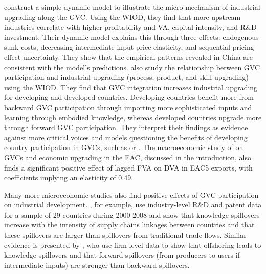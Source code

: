 \documentclass[a4paper]{article}
\begin{document}
\citet{shen2021towards} construct a simple dynamic model to illustrate the micro-mechanism of industrial upgrading along the GVC. Using the WIOD, they find that more upstream industries correlate with higher profitability and VA, capital intensity, and R\&D investment. Their dynamic model explains this through three effects: endogenous sunk costs, decreasing intermediate input price elasticity, and sequential pricing effect uncertainty. They show that the empirical patterns revealed in China are consistent with the model's predictions. \citet{tian2022global} also study the relationship between GVC participation and industrial upgrading (process, product, and skill upgrading) using the WIOD. They find that GVC integration increases industrial upgrading for developing and developed countries. Developing countries benefit more from backward GVC participation through importing more sophisticated inputs and learning through embodied knowledge, whereas developed countries upgrade more through forward GVC participation. They interpret their findings as evidence against more critical voices and models questioning the benefits of developing country participation in GVCs, such as \citet{baldwin2014trade} or \citet{dalle2013industrial}. The macroeconomic study of \citet{lwesya2022integration} on GVCs and economic upgrading in the EAC, discussed in the introduction, also finds a significant positive effect of lagged FVA on DVA in EAC5 exports, with coefficients implying an elasticity of 0.49. \newline 

Many more microeconomic studies also find positive effects of GVC participation on industrial development. \citet{piermartini2014knowledge}, for example, use industry-level R\&D and patent data for a sample of 29 countries during 2000-2008 and show that knowledge spillovers increase with the intensity of supply chains linkages between countries and that these spillovers are larger than spillovers from traditional trade flows. Similar evidence is presented by \citet{benz2015trade}, who use firm-level data to show that offshoring leads to knowledge spillovers and that forward spillovers (from producers to users if intermediate inputs) are stronger than backward spillovers. \newline 
\end{document}
